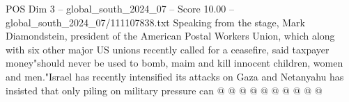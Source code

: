 \begin{textsample}{POS Dim 3 – global\_south\_2024\_07 – Score 10.00 – global\_south\_2024\_07/111107838.txt}
Speaking from the stage, Mark Diamondstein, president of the American Postal Workers Union, which along with six other major US unions recently called for a ceasefire, said taxpayer money"should never be used to bomb, maim and kill innocent children, women and men."Israel has recently intensified its attacks on Gaza and Netanyahu has insisted that only piling on military pressure can @ @ @ @ @ @ @ @ @ @

\end{textsample}
